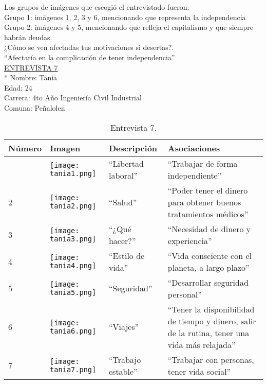 Los grupos de imágenes que escogió el entrevistado fueron:\\

Grupo 1: imágenes 1, 2, 3 y 6, mencionando que representa la independencia \\

Grupo 2: imágenes 4 y 5, mencionando que refleja el capitalismo y que siempre habrán deudas.\\


¿Cómo se ven afectadas tus motivaciones si desertas?.\\

``Afectaría en la complicación de tener independencia''\\

\newpage
\underline {ENTREVISTA 7}\\*
Nombre: Tania \\
Edad: 24\\
Carrera: 4to Año Ingeniería Civil Industrial \\
Comuna: Peñalolen \\

\begin{table}[H]
\centering
\begin{tabular}{>{\centering\arraybackslash}m{1cm} >{\centering\arraybackslash}m{2cm} >{\arraybackslash}m{5cm}>{\arraybackslash}m{5cm}}
\hline
Número  & Imagen & Descripción & Asociaciones \\
\hline \hline

1 & \texttt{[image: tania1.png]} & ``Libertad laboral'' & ``Trabajar de forma independiente'' \\
\hline

2 & \texttt{[image: tania2.png]} & ``Salud'' & ``Poder tener el dinero para obtener buenos tratamientos médicos'' \\
\hline

3 & \texttt{[image: tania3.png]} & ``¿Qué hacer?'' & ``Necesidad de dinero y experiencia'' \\
\hline

4 & \texttt{[image: tania4.png]} & ``Estilo de vida'' & ``Vida consciente con el planeta, a largo plazo'' \\
\hline

5 & \texttt{[image: tania5.png]} & ``Seguridad'' & ``Desarrollar seguridad personal'' \\
\hline

6 & \texttt{[image: tania6.png]} & ``Viajes'' & ``Tener la disponibilidad de tiempo y dinero, salir de la rutina, tener una vida más relajada''\\
\hline

7 & \texttt{[image: tania7.png]} & ``Trabajo estable'' & ``Trabajar con personas, tener vida social''\\
\hline

\end{tabular}
\caption{Entrevista 7.}
\label{tabla:tania}
\end{table}

